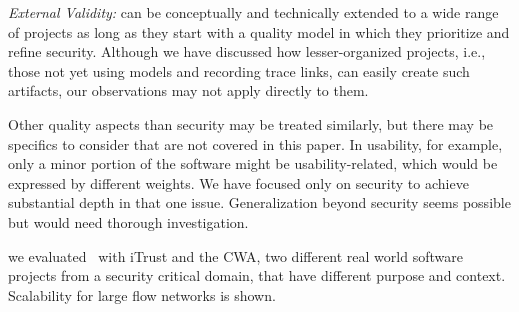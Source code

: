 
\textit{External Validity:}
%
\appr{} can be conceptually and technically extended to a wide range of projects as long as they start with a quality model in which they prioritize and refine security.
Although we have discussed how lesser-organized projects, i.e., those not yet using models and recording trace links, can easily create such artifacts, our observations may not apply directly to them.

Other quality aspects than security may be treated similarly, but there may be specifics to consider that are not covered in this paper.
In usability, for example, only a minor portion of the software might be usability-related, which would be expressed by different weights.
We have focused only on security to achieve substantial depth in that one issue.
Generalization beyond security seems possible but would need thorough investigation.

we evaluated \appr\ with iTrust and the CWA, two different real world software projects from a security critical domain, that have different purpose and context.
Scalability for large flow networks is shown.


